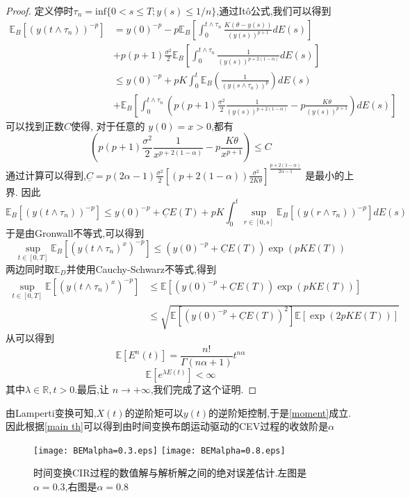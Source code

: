 	\begin{proof}
		定义停时$\tau_{n}=\mathrm{inf}\{0<s\leq T;y(s)\leq1/n\}$,通过It\^{o}公式,我们可以得到
		$$\begin{aligned}
			\mathbb{E}_B\left[(y(t\wedge\tau_{n}))^{-p}\right] &=y(0)^{-p}-p\mathbb{E}_B\left[\int_{0}^{t\wedge\tau_{n}}\frac{K(\theta-y(s))}{(y(s))^{p+1}}dE(s)\right]\\
			&+p(p+1)\frac{\sigma^{2}}{2}\mathbb{E}_B\left[\int_{0}^{t\wedge\tau_{n}}\frac{1}{(y(s))^{p+2(1-\alpha)}}dE(s)\right] \\
			&\leq y(0)^{-p}+pK\int_{0}^{t}\mathbb{E}_B\left(\frac{1}{(y(s\wedge\tau_{n}))^{p}}
			\right)dE(s) \\
			&+\mathbb{E}_B\left[\int_0^{t\wedge\tau_n}\left(p(p+1)\frac{\sigma^2}{2}\frac{1}{(y(s))^{p+2(1-\alpha)}}-p\frac{K\theta}{(y(s))^{p+1}}\right)dE(s)\right]
		\end{aligned}$$
		可以找到正数$C$使得, 对于任意的 $y(0)=x>0$,都有
		$$\left(p(p+1)\frac{\sigma^2}{2}\frac{1}{x^{p+2(1-\alpha)}}-p\frac{K\theta}{x^{p+1}}\right)\leq C$$
		通过计算可以得到,$\underline C=p(2\alpha-1)\frac{\sigma^2}{2}\left[(p+2(1-\alpha))\frac{\sigma^2}{2K\theta}\right]^{\frac{p+2(1-\alpha)}{2\alpha-1}}$ 是最小的上界. 因此
		$$\mathbb{E}_B\left[(y(t\wedge\tau_n))^{-p}\right]\leq y(0)^{-p}+\underline{C}E(T)+pK\int_0^t\sup_{r\in[0,s]}\mathbb{E}_B\left[(y(r\wedge\tau_n))^{-p}\right]dE(s)$$
		于是由Gronwall不等式,可以得到
		$$\sup\limits_{t\in[0,T]}\mathbb{E}_B\left[(y(t\wedge\tau_n)^x)^{-p}\right]\leq\left(y(0)^{-p}+\underline{C}E(T)\right)\exp(pKE(T))$$
		两边同时取$\mathbb{E}_D$并使用Cauchy-Schwarz不等式,得到
		$$\begin{aligned}
			\sup\limits_{t\in[0,T]}\mathbb{E}\left[(y(t\wedge\tau_n)^x)^{-p}\right]&\leq\mathbb{E}\left[\left(y(0)^{-p}+\underline{C}E(T)\right)\exp(pKE(T))\right]\\
			&\leq\sqrt{\mathbb{E}\left[\left(y(0)^{-p}+\underline{C}E(T)\right)^2\right]\mathbb{E}\left[\exp(2pKE(T))\right]}
		\end{aligned}$$
		从\cite{jum2014strong}可以得到
		\begin{equation}
			\mathbb{E}[E^n(t)]=\frac{n!}{\Gamma(n\alpha+1)}t^{n\alpha}
		\end{equation}
		\begin{equation}
			\mathbb{E}[e^{\lambda E(t)}]<\infty
		\end{equation}
		其中$\lambda \in \mathbb{R},t>0$.最后,让 $n\to+\infty$,我们完成了这个证明.
	\end{proof}
	
	
	由Lamperti变换可知,$X(t)$的逆阶矩可以$y(t)$的逆阶矩控制,于是\cref{moment}成立.因此根据\cref{main th}可以得到由时间变换布朗运动驱动的CEV过程的收敛阶是$\alpha$
	\
	
	\begin{figure}[htp!]
		\centering
		\texttt{[image: BEMalpha=0.3.eps]}
		\hfill
		\texttt{[image: BEMalpha=0.8.eps]}
		\caption{时间变换CIR过程的数值解与解析解之间的绝对误差估计.左图是$\alpha=0.3$,右图是$\alpha=0.8$}
		\label{fig:image}
		\vspace{-2ex}
	\end{figure}
	
